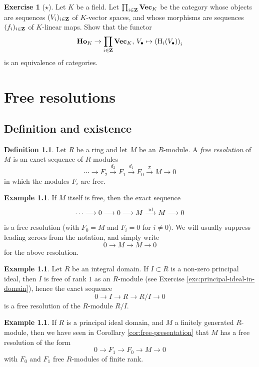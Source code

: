 \documentclass[11pt]{amsbook}
\newcommand{\longto}{\longrightarrow}
\renewcommand{\Vec}{\operatorname{{\bf{Vec}}}}
\def\rH{{\mathrm H}} \def\rK{{\mathrm K}} \def\rR{{\mathrm R}}
\def\id{{\rm id}}
\def\Ho{\mathbf{Ho}}
\theoremstyle{plain}
\theoremstyle{definition}
\newtheorem{definition}[theorem]{Definition}
\newtheorem{example}[theorem]{Example}
\newtheorem{exercise}{Exercise}
\begin{document}
\begin{exercise}[$\star$]
Let $K$ be a field. Let $\prod_{i\in \bZ} \Vec_K$ be the category whose objects are sequences $(V_i)_{i\in {\mathbf{Z}}}$ of $K$-vector spaces, and whose morphisms are sequences $(f_i)_{i\in {\mathbf{Z}}}$ of $K$-linear maps. Show that the functor
\[
	\Ho_K \to \prod_{i\in \bZ} \Vec_K,\, V_\bullet \mapsto \left( \rH_i(V_\bullet) \right)_{i}
\]
is an equivalence of categories.
\end{exercise}



\chapter{Free resolutions}

\section{Definition and existence}




\begin{definition}
Let $R$ be a ring and let $M$ be an $R$-module. A \emph{free resolution} of $M$ is an exact sequence
of $R$-modules
\[
	\cdots \longto F_2 \overset{d_2}{\longto} F_1 \overset{d_1}{\longto} F_0 \overset{\pi}{\longto} M \longto 0 
\]
in which the modules $F_i$ are free.
\end{definition}

\begin{example}
If $M$ itself is free, then the exact sequence
\[
	\cdots \longto 0 \longto 0 \longto M \overset{\id}{\longto} M \longto 0
\]
is a free resolution (with $F_0=M$ and $F_i=0$ for $i\neq 0$). We will usually suppress leading zeroes from the notation, and simply write 
\[
	0 \longto M \longto M \longto 0
\]
for the above resolution.
\end{example}

\begin{example}Let $R$ be an integral domain. 
If $I \subset R$ is a non-zero principal ideal, then $I$ is free of rank $1$ as an $R$-module (see Exercise \ref{exc:principal-ideal-in-domain}), hence the exact sequence
\[
	0 \longto I \longto R \longto R/I \longto 0
\]
is a free resolution of the $R$-module $R/I$.
\end{example}

\begin{example}
If $R$ is a principal ideal domain, and $M$ a finitely generated $R$-module, then we have seen in
Corollary \ref{cor:free-presentation} that $M$ has a free resolution of the form
\[
	0 \longto F_1 \longto F_0 \longto M \longto 0
\]
with $F_0$ and $F_1$ free $R$-modules of finite rank.
\end{example}
\end{document}

